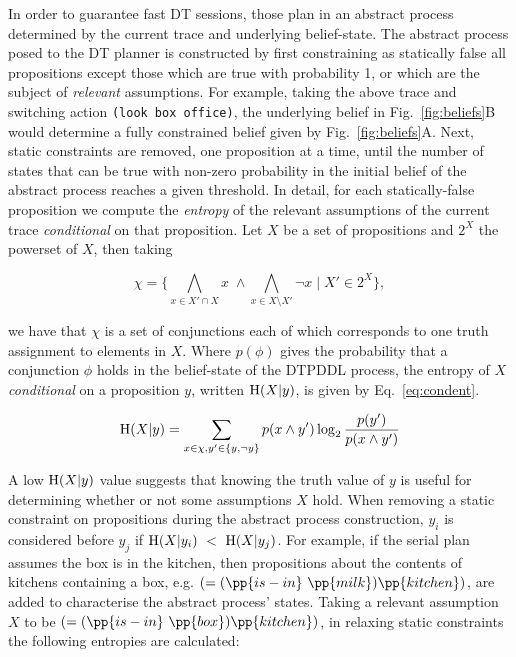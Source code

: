 In order to guarantee fast DT sessions, those plan in an abstract
process determined by the current trace and underlying belief-state.
The abstract process posed to the DT planner is constructed by first
constraining as statically false all propositions except those which
are true with probability 1, or which are the subject of {\em
  relevant} assumptions. For example, taking the above trace and
switching action {\texttt \mbox{(look~box~office)}}, the underlying
belief in Fig.~\ref{fig:beliefs}B would determine a fully constrained
belief given by Fig.~\ref{fig:beliefs}A.  Next, static constraints are
removed, one proposition at a time, until the number of states that
can be true with non-zero probability in the initial belief of the
abstract process reaches a given threshold.  In detail, for each
statically-false proposition we compute the {\em entropy} of the
relevant assumptions of the current trace {\em conditional} on that
proposition.  Let $X$ be a set of propositions and $2^X$ the powerset
of $X$, then taking


\small
\[
\chi = \{\bigwedge_{x \in X'
  \cap X}x \; \land \bigwedge_{x \in X \setminus X'}\neg x \;|\; X' \in 2^X\},
\]
\normalsize

\noindent we have that $\chi$ is a set of conjunctions each of which
corresponds to one truth assignment to elements in $X$. Where
$p(\phi)$ gives the probability that a conjunction $\phi$ holds in the
belief-state of the DTPDDL process, the entropy of $X$
\emph{conditional} on a proposition $y$, written $\entropy(X|y)$, is
given by Eq.~\ref{eq:condent}.

\vspace{-1ex}
\small
\begin{equation}\label{eq:condent}
  \entropy(X|y) = \sum_{x \in \chi, y' \in \{y, \neg y\}} p(x \land y') \log_2
  \frac{p(y')}{p(x \land y')}
\end{equation}
\normalsize

A low $\entropy(X|y)$ value suggests that knowing the truth value of
$y$ is useful for determining whether or not some assumptions $X$
hold. When removing a static constraint on propositions during the
abstract process construction, $y_i$ is considered before $y_j$ if
$\entropy(X|y_i)~<~\entropy(X|y_j)$. For example, if the serial plan
assumes the box is in the kitchen, then propositions about the
contents of kitchens containing a box,
e.g. $(=(\pp{is-in}~\pp{milk})\pp{kitchen})$, are added to
characterise the abstract process' states. Taking a relevant
assumption $X$ to be $(=(\pp{is-in}~\pp{box})\pp{kitchen})$, in
relaxing static constraints the following entropies are calculated:

